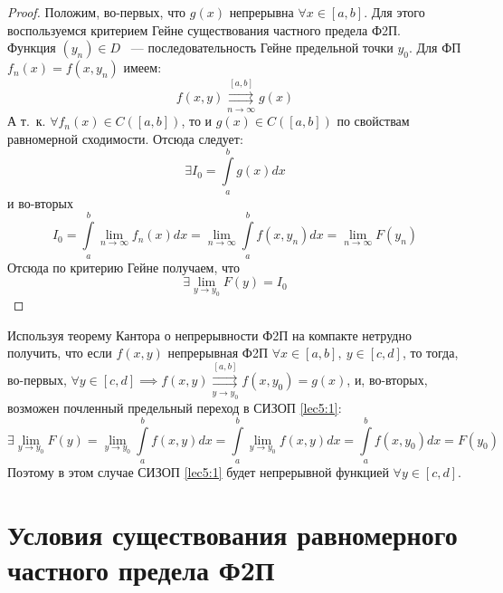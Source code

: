 \documentclass[../../main.tex]{subfiles}
\begin{document}
\begin{proof}
	Положим, во-первых, что $ g(x) $ непрерывна $ \forall x \in [a, b] $.
	Для этого воспользуемся критерием Гейне существования частного предела Ф2П.
	\\
	Функция $(y_n) \in D$ ~--- последовательность Гейне предельной точки $y_0$.
	Для ФП $ f_n(x) = f(x, y_n) $ имеем:
	\[
	f(x, y) \stackrel{[a, b]}{\underset{n \to \infty}{\rightrightarrows}} g(x)
	\]
	А т.~к. $ \forall f_n(x) \in C([a, b])$, то и $ g(x) \in C([a, b]) $ по 
	свойствам равномерной сходимости.
	Отсюда следует:
	\[
	\exists I_0 = \int\limits_a^b g(x) dx
	\]
	и во-вторых
	\[
	I_0 = \int\limits_a^b \lim\limits_{n \to \infty} f_n(x) dx = 
	\lim\limits_{n \to \infty} \int\limits_a^b f(x, y_n) dx = 
	\lim\limits_{n \to \infty} F(y_n)
	\]
	Отсюда по критерию Гейне получаем, что
	\[
	\exists \lim\limits_{y \to y_0} F(y) = I_0
	\]
\end{proof}
\begin{rem}
	Используя теорему Кантора о непрерывности Ф2П на компакте нетрудно получить,
	что если $ f(x, y) $ непрерывная Ф2П $ \forall x \in [a, b],\ 
	y \in [c, d] $, то тогда, во-первых, $ \forall y \in [c, d] \implies 
	f(x, y) \stackrel{[a, b]}{\underset{y \to y_0}{\rightrightarrows}} f(x, y_0)
	= g(x)
	$, и, во-вторых, возможен почленный предельный переход 
	в СИЗОП \eqref{lec5:1}:
	\[
	\exists \lim\limits_{y \to y_0} F(y) = 
	\lim\limits_{y \to y_0} \int\limits_a^b f(x, y) dx = 
	\int\limits_a^b \lim\limits_{y \to y_0} f(x, y) dx =
	\int\limits_a^b f(x, y_0) dx = F(y_0)
	\]
	Поэтому в этом случае СИЗОП \eqref{lec5:1} будет непрерывной функцией 
	$ \forall y \in [c, d] $.
\end{rem}

\section{Условия существования равномерного частного предела Ф2П}
\end{document}
